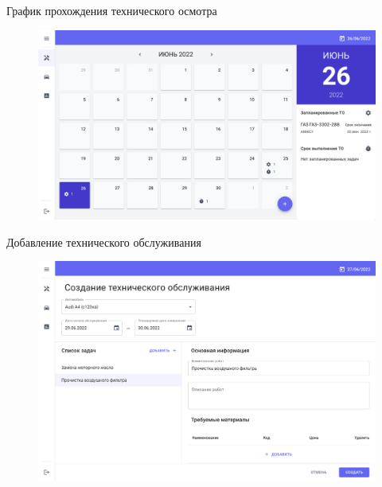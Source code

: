 \documentclass{beamer}
\begin{document}
\begin{frame}
	{График прохождения технического осмотра}
    \begin{figure}[H]
        \centering
        \includegraphics[keepaspectratio,width=\textwidth]{presentation/images/tech.plumpalbert.xyz.calendar.png}
    \end{figure}
\end{frame}
\begin{frame}
	{Добавление технического обслуживания}
    \begin{figure}[H]
        \centering
        \includegraphics[keepaspectratio,width=\textwidth]{presentation/images/tech.plumpalbert.xyz.create_maintenance.png}
    \end{figure}
\end{frame}
\end{document}
